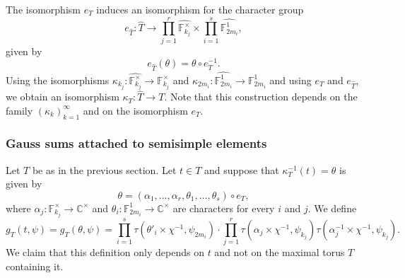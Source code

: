 \documentclass[12pt, reqno]{amsart}
\theoremstyle{definition}
\theoremstyle{definition}
\theoremstyle{definition}
\newcommand{\cComplex}{\mathbb{C}}
\newcommand{\multiplicativegroup}[1]{#1^{\times}}
\newcommand{\fieldCharacter}{\psi}
\newcommand{\finiteField}{\mathbb{F}}
\newcommand{\finiteFieldExtension}[1]{\finiteField_{#1}}
\newcommand{\charactergroup}[1]{\widehat{\multiplicativegroup{\finiteFieldExtension{#1}}}}
\newcommand{\GaussSumCharacter}[3]{\tau\left(#1 \times #2, #3\right)}
\newcommand{\ToriDualToriIsomorphism}{\kappa}
\begin{document}
The isomorphism $e_T$ induces an isomorphism for the character group $$e_{\widehat{T}} \colon \widehat{T} \to \prod_{j=1}^r \charactergroup{k_j} \times \prod_{i=1}^s \widehat{\finiteFieldExtension{2m_i}^1},$$
given by
$$e_{\widehat{T}}\left(\theta\right) = \theta \circ e_T^{-1}.$$
Using the isomorphisms $\ToriDualToriIsomorphism_{k_j} \colon \charactergroup{k_j} \to \multiplicativegroup{\finiteFieldExtension{k_j}}$ and $\ToriDualToriIsomorphism_{2m_i} \colon \widehat{\finiteFieldExtension{2m_i}^1} \to \finiteFieldExtension{2m_i}^1$ and using $e_T$ and $e_{\widehat{T}}$, we obtain an isomorphism $\ToriDualToriIsomorphism_{T} \colon \widehat{T} \to T$. Note that this construction depends on the family $\left(\ToriDualToriIsomorphism_k\right)_{k=1}^{\infty}$ and on the isomorphism $e_T$.



\subsubsection{Gauss sums attached to semisimple elements}

Let $T$ be as in the previous section. Let $t \in T$ and suppose that $\ToriDualToriIsomorphism_{T}^{-1}\left(t\right) = \theta$ is given by $$\theta = \left(\alpha_1,\dots,\alpha_r,\theta_1,\dots,\theta_s\right) \circ e_T,$$ where $\alpha_j \colon \multiplicativegroup{\finiteFieldExtension{k_j}} \to \multiplicativegroup{\cComplex}$ and $\theta_i \colon \finiteFieldExtension{2m_i}^1 \to \multiplicativegroup{\cComplex}$ are characters for every $i$ and $j$.
We define $$g_T\left(t, \fieldCharacter\right) = g_T\left(\theta, \fieldCharacter\right) = \prod_{i=1}^s \GaussSumCharacter{\theta'_i}{\chi^{-1}}{\fieldCharacter_{2m_i}} \cdot  \prod_{j=1}^r \GaussSumCharacter{\alpha_j}{\chi^{-1}}{\fieldCharacter_{k_j}} \GaussSumCharacter{\alpha_j^{-1}}{\chi^{-1}}{\fieldCharacter_{k_j}}.$$
We claim that this definition only depends on $t$ and not on the maximal torus $T$ containing it.
\end{document}
